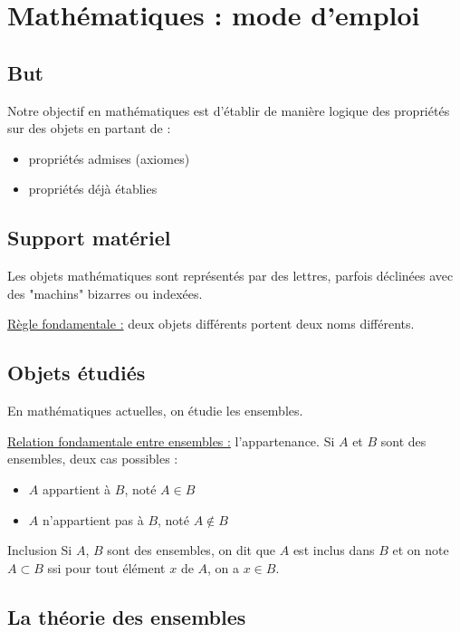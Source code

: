\section{Mathématiques : mode d'emploi}
\subsection{But}

Notre objectif en mathématiques est d'établir de manière logique des propriétés sur des objets en partant de : 
\begin{itemize}
    \item propriétés admises (axiomes)
    \item propriétés déjà établies
\end{itemize}

\subsection{Support matériel}

Les objets mathématiques sont représentés par des lettres, parfois déclinées avec des 
"machins" bizarres ou indexées. 

\uline{Règle fondamentale :} deux objets différents portent deux noms différents. 

\subsection{Objets étudiés}

En mathématiques actuelles, on étudie les ensembles. 

\uline{Relation fondamentale entre ensembles :} l'appartenance. Si $A$ et $B$ sont des 
ensembles, deux cas possibles : 

\begin{itemize}
    \item $A$ appartient à $B$, noté $A \in B$
    \item $A$ n'appartient pas à $B$, noté $A \notin B$
\end{itemize}

\begin{definition}{Inclusion}{}
    Si $A$, $B$ sont des ensembles, on dit que $A$ est inclus dans $B$ et on note 
    $A \subset B$ ssi pour tout élément $x$ de $A$, on a $x \in B$.
\end{definition}

\subsection{La théorie des ensembles}


